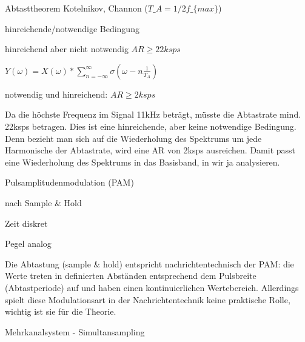 \documentclass[a4paper]{article}
\begin{document}
\begin{multicols}{3}
  Abtasttheorem Kotelnikov, Channon ($T\_A=1/2f\_\{max\}$)

  \begin{itemize*}
    \item hinreichende/notwendige Bedingung
    \item hinreichend aber nicht notwendig $AR\geq 22ksps$
    \item $Y(\omega)=X(\omega)*\sum^{\infty}_{n=-\infty} \sigma(\omega-n\frac{1}{T_A})$
    \item notwendig und hinreichend: $AR\geq 2ksps$
    \item Da die höchste Frequenz im Signal 11kHz beträgt, müsste die Abtastrate mind. 22ksps betragen. Dies ist eine hinreichende, aber keine notwendige Bedingung. Denn bezieht man sich auf die Wiederholung des Spektrums um jede Harmonische der Abtastrate, wird eine AR von 2ksps ausreichen. Damit passt eine Wiederholung des Spektrums in das Basisband, in wir ja analysieren.
  \end{itemize*}

  Pulsamplitudenmodulation (PAM)

  \begin{itemize*}
    \item nach Sample \& Hold
    \begin{itemize*}
      \item Zeit diskret
      \item Pegel analog
    \end{itemize*}
    \item Die Abtastung (sample \& hold) entspricht nachrichtentechnisch der PAM: die Werte treten in definierten Abständen entsprechend dem Pulsbreite (Abtastperiode) auf und haben einen kontinuierlichen Wertebereich. Allerdings spielt diese Modulationsart in der Nachrichtentechnik keine praktische Rolle, wichtig ist sie für die Theorie.
  \end{itemize*}

  Mehrkanalsystem - Simultansampling


\end{multicols}
\end{document}
